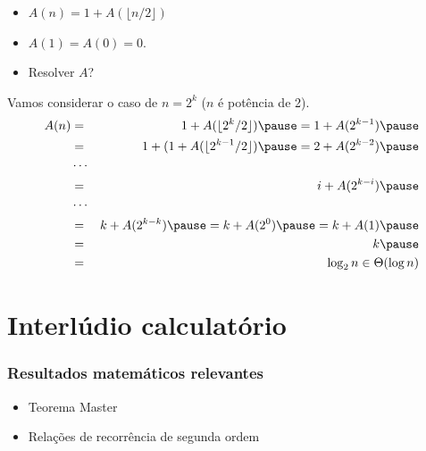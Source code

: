 \documentclass[handout]{beamer}
\begin{document}
\begin{frame}
\begin{itemize}
\item $A(n) = 1+A(\lfloor n/2 \rfloor)$
\item $A(1) = A(0) = 0$.
\item Resolver $A$?
\end{itemize}
Vamos considerar o caso de $n = 2^k$ ($n$ é potência de 2).
\begin{eqnarray*}
A(n) & = & 1 + A (\lfloor 2^k/2 \rfloor) \pause = 1 + A (2^{k-1}) \pause \\
     & = & 1 + (1 + A(\lfloor 2^{k-1}/2 \rfloor) \pause = 2 + A(2^{k-2}) \pause \\
     & \cdots & \\
     & = & i + A(2^{k-i}) \pause \\
     & \cdots & \\
     & = & k + A(2^{k-k}) \pause = k + A(2^0) \pause = k + A(1) \pause \\
     & = & k \pause \\
     & = & \log_2 n \in \Theta(\log n) 
\end{eqnarray*}
\end{frame}

\section{Interlúdio calculatório}

\begin{frame}

\frametitle{Resultados matemáticos relevantes}

\begin{itemize}

\item Teorema Master

\item Relações de recorrência de segunda ordem
\end{itemize}

\end{frame}
\end{document}
